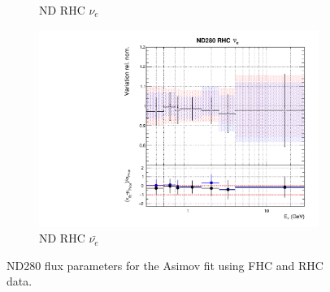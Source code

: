 \begin{figure}[t]
\begin{subfigure}{0.45\textwidth}
  \caption{ND RHC $\nu_{e}$}
\end{subfigure}
\begin{subfigure}{0.45\textwidth}
  \centering
  \includegraphics[width=0.75\linewidth]{figs/rhcmpasmvflux7}
  \caption{ND RHC $\bar{\nu_e}$}
\end{subfigure}
\caption{ND280 flux parameters for the Asimov fit using FHC and RHC data.}
\label{fig:rhcmpiasmvND}
\end{figure}

